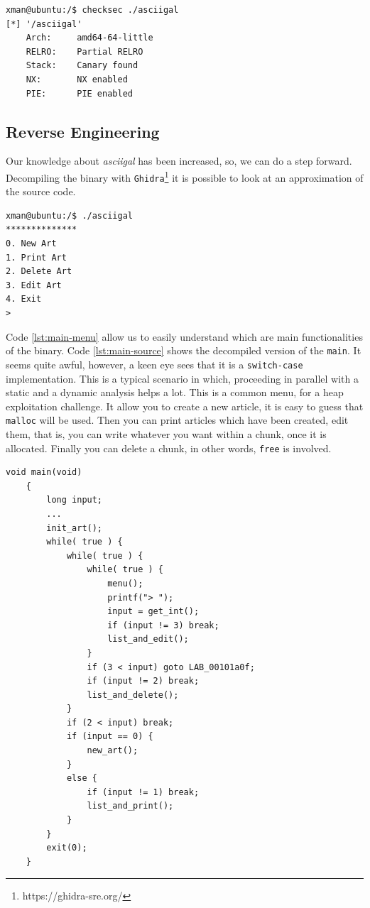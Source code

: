 \documentclass{article}
\numberwithin{equation}{subsection}
\begin{document}
\begin{minipage}{\textwidth}
\centering
\lstset{style=consolestyle}
\begin{lstlisting}[caption={Checksec command on asciigal executable.},captionpos=b,label={lst:checksec-command}]
xman@ubuntu:/$ checksec ./asciigal
[*] '/asciigal'
    Arch:     amd64-64-little
    RELRO:    Partial RELRO
    Stack:    Canary found
    NX:       NX enabled
    PIE:      PIE enabled
\end{lstlisting}
\end{minipage}
\subsection{Reverse Engineering}
\label{functionalities}
Our knowledge about \emph{asciigal} has been increased, so, we can do a step forward. Decompiling the binary with \texttt{Ghidra}\footnote{https://ghidra-sre.org/} it is possible to look at an approximation of the source code.\newline
\begin{minipage}{\textwidth}
\centering
\lstset{style=consolestyle}
\begin{lstlisting}[caption={Main menu of asciigal executable.},captionpos=b,label={lst:main-menu}]
xman@ubuntu:/$ ./asciigal
**************
0. New Art
1. Print Art
2. Delete Art
3. Edit Art
4. Exit
> 
\end{lstlisting}
\end{minipage}
Code \ref{lst:main-menu} allow us to easily understand which are main functionalities of the binary.\newline
Code \ref{lst:main-source} shows the decompiled version of the \texttt{main}. It seems quite awful, however, a keen eye sees that it is a \texttt{switch-case} implementation. This is a typical scenario in which, proceeding in parallel with a static and a dynamic analysis helps a lot.
This is a common menu, for a heap exploitation challenge. It allow you to create a new article, it is easy to guess that \texttt{malloc} will be used. Then you can print articles which have been created, edit them, that is, you can write whatever you want within a chunk, once it is allocated. Finally you can delete a chunk, in other words,  \texttt{free} is involved.\newline
\noindent
\begin{minipage}{\textwidth}
\centering
\lstset{style=cstyle}
\begin{lstlisting}[caption={Main routine of asciigal source code.},captionpos=b,label={lst:main-source}]
    void main(void)
    {
    	long input;
    	...
    	init_art();
    	while( true ) {
    		while( true ) {
    			while( true ) {
    				menu();
    				printf("> ");
    				input = get_int();
    				if (input != 3) break;
    				list_and_edit();
    			}
    			if (3 < input) goto LAB_00101a0f;
    			if (input != 2) break;
    			list_and_delete();
    		}
    		if (2 < input) break;
    		if (input == 0) {
    			new_art();
    		}
    		else {
    			if (input != 1) break;
    			list_and_print();
    		}
    	}
    	exit(0);
    }
\end{lstlisting}
\end{minipage}
\clearpage
\end{document}
